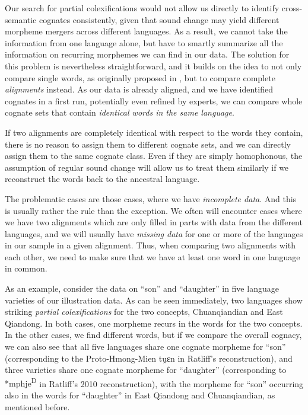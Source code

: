 \documentclass[xetex,svgnames]{scrartcl}
\begin{document}
Our search for partial colexifications would not allow us directly to identify cross-semantic
cognates consistently, given that sound change may yield different morpheme mergers across different
languages. As a result, we cannot take the information from one language alone, but have to smartly
summarize all the information on recurring morphemes we can find in our data. The solution for this
problem is nevertheless straightforward, and it builds on the idea to not only compare single words, as originally proposed in \citet{Hill2017a}, but to compare complete \emph{alignments} instead. As our data is already aligned, and we have identified
cognates in a first run, potentially even refined by experts, we can compare whole cognate sets that
contain \emph{identical words in the same language}.

If two alignments are completely identical with respect to the words they contain,
there is no reason
to assign them to different cognate sets, and we can directly assign them to the same cognate class.
Even if they are simply homophonous, the assumption of regular sound change will allow us to treat
them similarly if we reconstruct the words back to the ancestral language.

The problematic cases are those cases, where we have \emph{incomplete data}. And this is usually
rather the rule than the exception.  We often will encounter cases where we have two alignments
which are only filled in parts with data from the different languages, and we will usually have
\emph{missing data} for one or more of the languages in our sample in a given alignment. Thus, when
comparing two alignments with each other, we need to make sure that we have at least one word in one
language in common.

As an example, consider the data on ``son'' and ``daughter'' in five language varieties of our
illustration data. As can be seen immediately, two languages show striking \emph{partial
colexifications} for the two concepts, Chuanqiandian and East Qiandong. In both cases, one morpheme
recurs in the words for the two concepts. In the other cases, we find different words, but if we
compare the overall cognacy, we can also see that all five languages share one cognate morpheme for
``son'' (corresponding to the Proto-Hmong-Mien {\sil *tu̯ɛn} in Ratliff's reconstruction),
and three varieties share one cognate morpheme for ``daughter'' (corresponding to {\sil
*mphje\textsuperscript{D}} in Ratliff's 2010 reconstruction), with the morpheme for ``son''
occurring also in the words for ``daughter'' in East Qiandong and Chuanqiandian, as mentioned
before.\nocite{Ratliff2010}
\end{document}
